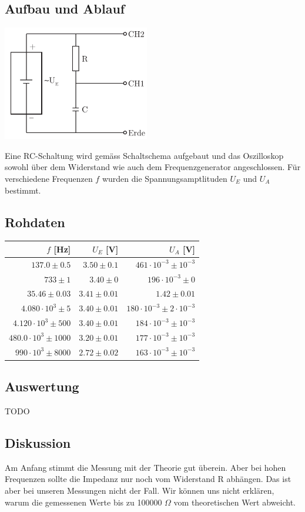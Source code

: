 \documentclass[12pt,a4paper]{article}
\begin{document}
\subsection*{Aufbau und Ablauf}
\includegraphics[height=5cm]{illustration3.pdf}

\noindent
Eine RC-Schaltung wird gem\"ass Schaltschema aufgebaut und das Oszilloskop sowohl \"uber dem Widerstand wie auch dem Frequenzgenerator angeschlossen. F\"ur verschiedene Frequenzen $f$ wurden die Spannungsamptlituden $U_E$ und $U_A$ bestimmt.

\subsection*{Rohdaten} 
\begin{tabular}{|r|r|r|}
\hline
$f$ [Hz]&$U_E$ [V]&$U_A$ [V]\\
\hline
$137.0 \pm 0.5$&$3.50 \pm 0.1$&$461\cdot 10^{-3} \pm 10^{-3}$\\
$733 \pm 1$&$3.40 \pm 0$&$196\cdot 10^{-3} \pm 0$\\
$35.46 \pm 0.03$&$3.41 \pm 0.01$&$1.42 \pm 0.01$\\
$4.080\cdot 10^{3} \pm 5$&$3.40 \pm 0.01$&$180\cdot 10^{-3} \pm 2\cdot 10^{-3}$\\
$4.120\cdot 10^{3} \pm 500$&$3.40 \pm 0.01$&$184\cdot 10^{-3} \pm 10^{-3}$\\
$480.0\cdot 10^{3} \pm 1000$&$3.20 \pm 0.01$&$177\cdot 10^{-3} \pm 10^{-3}$\\
$990\cdot 10^{3} \pm 8000$&$2.72 \pm 0.02$&$163\cdot 10^{-3} \pm 10^{-3}$\\
\hline
\end{tabular}

\subsection*{Auswertung}
TODO

\subsection*{Diskussion}
Am Anfang stimmt die Messung mit der Theorie gut \"uberein. Aber bei hohen Frequenzen sollte die Impedanz nur noch vom Widerstand R abh\"angen. Das ist aber bei unseren Messungen nicht der Fall. Wir k\"onnen uns nicht erkl\"aren, warum die gemessenen Werte bis zu 100000 $\Omega$ vom theoretischen Wert abweicht.
\end{document}
